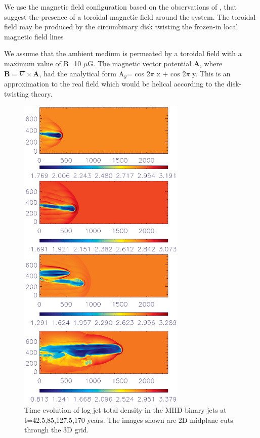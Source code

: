 \documentclass{aa}
\begin{document}
We use the magnetic field configuration based on the observations 
of \citet{1988MNRAS.231P..39S}, 
 that suggest the presence of a toroidal magnetic field around 
the system. The toroidal field may be
produced by the circumbinary disk twisting 
the frozen-in local magnetic field lines \citep[see, e.g.][ and the references
therein.]{2004ApJ...607L..43M}

We assume that the ambient medium is permeated by a toroidal field 
with a maximum value of B=10 $\mu$G. The magnetic
vector potential ${\mathbf A}$, where 
${\mathbf B = \nabla} \times {\mathbf A}$,
had the analytical form A$_y$= cos 2$\pi$ x + cos 2$\pi$ y.
This is an approximation to the real field which would be helical according to
the disk-twisting theory.

\begin{figure}[t]
\centering
\includegraphics[width=8cm]{8609fig4.eps}
\caption{ 
Time evolution of log jet total density 
in the MHD binary jets at t=42.5,85,127.5,170 years. 
The images shown are
2D midplane cuts through the 3D grid.
}
\label{fig:4-49}
\end{figure}
\end{document}
